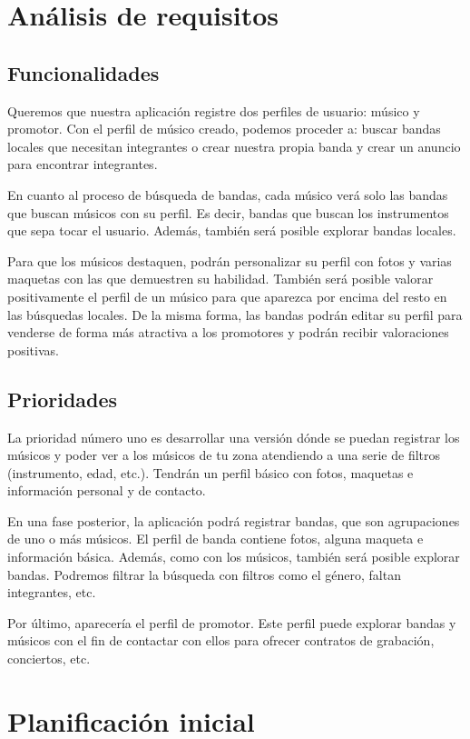 \documentclass[a4paper,12pt]{article}
\begin{document}
\section{Análisis de requisitos}
\subsection{Funcionalidades}
Queremos que nuestra aplicación registre dos perfiles de usuario: músico y promotor. Con el perfil de músico creado, podemos proceder a: buscar bandas locales que necesitan integrantes o crear nuestra propia banda y crear un anuncio para encontrar integrantes.

En cuanto al proceso de búsqueda de bandas, cada músico verá solo las bandas que buscan músicos con su perfil. Es decir, bandas que buscan los instrumentos que sepa tocar el usuario. Además, también será posible explorar bandas locales.

Para que los músicos destaquen, podrán personalizar su perfil con fotos y varias maquetas con las que demuestren su habilidad. También será posible valorar positivamente el perfil de un músico para que aparezca por encima del resto en las búsquedas locales. De la misma forma, las bandas podrán editar su perfil para venderse de forma más atractiva a los promotores y podrán recibir valoraciones positivas.
\subsection{Prioridades}
La prioridad número uno es desarrollar una versión dónde se puedan registrar los músicos y poder ver a los músicos de tu zona atendiendo a una serie de filtros (instrumento, edad, etc.). Tendrán un perfil básico con fotos, maquetas e información personal y de contacto.

En una fase posterior, la aplicación podrá registrar bandas, que son agrupaciones de uno o más músicos. El perfil de banda contiene fotos, alguna maqueta e información básica. Además, como con los músicos, también será posible explorar bandas. Podremos filtrar la búsqueda con filtros como el género, faltan integrantes, etc.

Por último, aparecería el perfil de promotor. Este perfil puede explorar bandas y músicos con el fin de contactar con ellos para ofrecer contratos de grabación, conciertos, etc.
\section{Planificación inicial}
\end{document}
